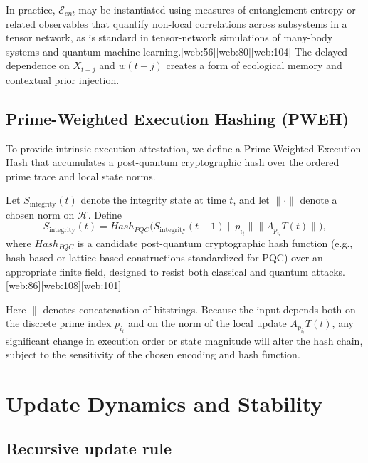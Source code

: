 \documentclass[11pt]{article}
\begin{document}
In practice, \( \mathcal{E}_{ent} \) may be instantiated using measures of entanglement entropy or related observables that quantify non-local correlations across subsystems in a tensor network, as is standard in tensor-network simulations of many-body systems and quantum machine learning.[web:56][web:80][web:104] The delayed dependence on \( X_{t-j} \) and \( w(t-j) \) creates a form of ecological memory and contextual prior injection.

\subsection{Prime-Weighted Execution Hashing (PWEH)}

To provide intrinsic execution attestation, we define a Prime-Weighted Execution Hash that accumulates a post-quantum cryptographic hash over the ordered prime trace and local state norms.

\begin{description}[leftmargin=2em]
\item[Definition 4 (Integrity functional).]
Let \( S_{\text{integrity}}(t) \) denote the integrity state at time \( t \), and let \( \|\cdot\| \) denote a chosen norm on \( \mathcal{H} \). Define
\[
S_{\text{integrity}}(t)
=
Hash_{PQC}\Big(
S_{\text{integrity}}(t-1)
\parallel p_{i_t}
\parallel \|A_{p_{i_t}} T(t)\|
\Big),
\]
where \( Hash_{PQC} \) is a candidate post-quantum cryptographic hash function (e.g., hash-based or lattice-based constructions standardized for PQC) over an appropriate finite field, designed to resist both classical and quantum attacks.[web:86][web:108][web:101]

\end{description}

Here \( \parallel \) denotes concatenation of bitstrings. Because the input depends both on the discrete prime index \( p_{i_t} \) and on the norm of the local update \( A_{p_{i_t}} T(t) \), any significant change in execution order or state magnitude will alter the hash chain, subject to the sensitivity of the chosen encoding and hash function.

\section{Update Dynamics and Stability}

\subsection{Recursive update rule}
\end{document}
